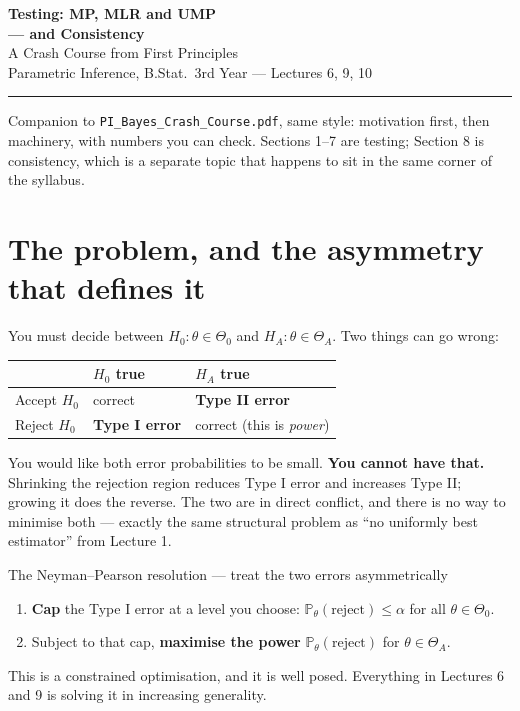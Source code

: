 \documentclass[11pt]{article}
\newcommand{\Prob}{\mathbb{P}}
\begin{document}
\begin{center}
{\LARGE\bfseries Testing: MP, MLR and UMP}\\[2pt]
{\large\bfseries --- and Consistency}\\[5pt]
{\large A Crash Course from First Principles}\\[5pt]
{\small Parametric Inference, B.Stat.\ 3rd Year --- Lectures 6, 9, 10}
\end{center}

\vspace{4pt}\hrule\vspace{10pt}

\noindent
Companion to \texttt{PI\_Bayes\_Crash\_Course.pdf}, same style: motivation first, then
machinery, with numbers you can check. Sections 1--7 are testing; Section 8 is consistency,
which is a separate topic that happens to sit in the same corner of the syllabus.

\tableofcontents

\section{The problem, and the asymmetry that defines it}

You must decide between $H_0:\theta\in\Theta_0$ and $H_A:\theta\in\Theta_A$. Two things can
go wrong:
\begin{center}
\renewcommand{\arraystretch}{1.3}
\begin{tabular}{@{}lll@{}}
\toprule
& \textbf{$H_0$ true} & \textbf{$H_A$ true} \\
\midrule
Accept $H_0$ & correct & \textbf{Type II error} \\
Reject $H_0$ & \textbf{Type I error} & correct (this is \emph{power}) \\
\bottomrule
\end{tabular}
\end{center}

You would like both error probabilities to be small. \textbf{You cannot have that.} Shrinking
the rejection region reduces Type I error and increases Type II; growing it does the reverse.
The two are in direct conflict, and there is no way to minimise both --- exactly the same
structural problem as ``no uniformly best estimator'' from Lecture 1.

\begin{idea}{The Neyman--Pearson resolution --- treat the two errors asymmetrically}
\begin{enumerate}
\item \textbf{Cap} the Type I error at a level you choose: $\Prob_{\theta}(\text{reject})\le\alpha$
for all $\theta\in\Theta_0$.
\item Subject to that cap, \textbf{maximise the power} $\Prob_\theta(\text{reject})$ for
$\theta\in\Theta_A$.
\end{enumerate}
This is a constrained optimisation, and it is well posed. Everything in Lectures 6 and 9 is
solving it in increasing generality.
\end{idea}
\end{document}
